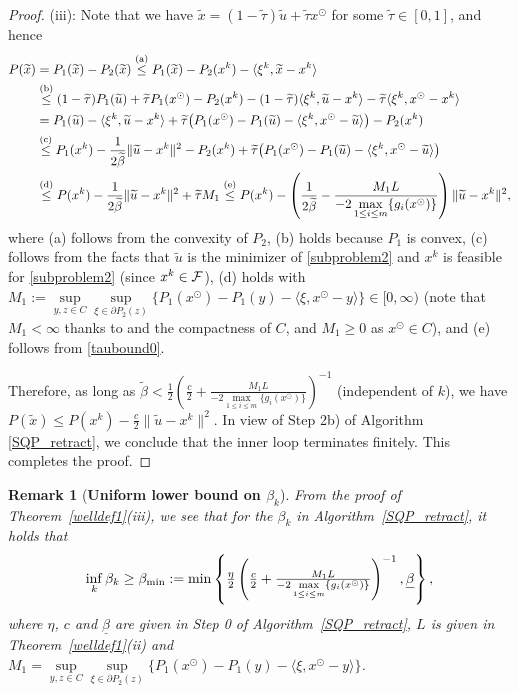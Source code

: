 \documentclass[10pt]{article}
\numberwithin{equation}{section}
\newtheorem{remark}{Remark}[section]
\def\xfeas{x^\odot}
\def\betamin{{\rm \beta_{min}}}
\begin{document}
\begin{proof}
(iii): Note that we have $\widetilde{x} = (1 - \widetilde{\tau})\widetilde{u} + \widetilde{\tau} \xfeas$ for some $\widetilde{\tau}\in [0,1]$, and hence
\[
\begin{aligned}
P(\widetilde{x}) &= P_1(\widetilde{x}) - P_2(\widetilde{x}) \overset{\rm (a)}\leq P_1(\widetilde{x}) - P_2(x^k) - \langle \xi^k, \widetilde{x} - x^k\rangle \\
&\overset{\rm (b)}\leq (1 - \widetilde{\tau})P_1(\widetilde{u}) + \widetilde{\tau}P_1(\xfeas) - P_2(x^k) - (1 - \widetilde{\tau})\langle \xi^k, \widetilde{u} - x^k\rangle - \widetilde{\tau}\langle \xi^k, \xfeas - x^k\rangle\\
&= P_1(\widetilde{u}) - \langle \xi^k, \widetilde{u} - x^k\rangle + \widetilde{\tau}\big(P_1(\xfeas) - P_1(\widetilde{u}) - \langle \xi^k, \xfeas - \widetilde{u}\rangle \big) - P_2(x^k)\\
&\overset{\rm (c)}\leq P_1(x^k) - \frac{1}{2\widetilde{\beta}}\|\widetilde{u} - x^k\|^2  - P_2(x^k) + \widetilde{\tau}\big(P_1(\xfeas) - P_1(\widetilde{u}) - \langle \xi^k, \xfeas - \widetilde{u}\rangle \big)\\
&\overset{\rm (d)}\leq P(x^k) - \frac{1}{2\widetilde{\beta}}\|\widetilde{u} - x^k\|^2 + \widetilde{\tau}M_1 \overset{\rm (e)}\leq P(x^k) - \left(\frac{1}{2\widetilde{\beta}} - \frac{M_1L}{-2\max\limits_{1\le i\le m}\{g_i(\xfeas)\}}\right)\|\widetilde{u} - x^k\|^2,
\end{aligned}
\]
where (a) follows from the convexity of $P_2$, (b) holds because $P_1$ is convex, (c) follows from the facts that $\widetilde{u}$ is the minimizer of \eqref{subproblem2} and $x^k$ is feasible for \eqref{subproblem2} (since $x^k \in {\cal F}$), (d) holds with $M_1:= \sup\limits_{y,z\in C}\sup\limits_{\xi\in\partial P_2(z)} \{P_1(\xfeas) - P_1(y) - \langle\xi, \xfeas - y\rangle\}\in [0,\infty)$ (note that $M_1 < \infty$ thanks to \cite[Theorem~2.6]{Tu98} and the compactness of $C$, and $M_1 \ge 0$ as $\xfeas\in C$), and (e) follows from \eqref{taubound0}.

Therefore, as long as $\widetilde{\beta} < \frac{1}{2}\left(\frac{c}2 + \frac{M_1L}{-2\max\limits_{1 \le i \le m}\{g_i(\xfeas)\}}\right)^{-1}$ (independent of $k$), we have $P(\widetilde{x}) \leq P(x^k) - \frac{c}{2}\|\widetilde{u} - x^k\|^2$. In view of {Step 2b)} of Algorithm \ref{SQP_retract}, we conclude that the inner loop terminates finitely. This completes the proof.
\end{proof}

\begin{remark}[{{\bf Uniform lower bound on $\beta_k$}}]\label{gamma}
From the proof of Theorem~\ref{welldef1}(iii), we see that for the $\beta_k$ in Algorithm~\ref{SQP_retract}, it holds that
\[\inf_k \beta_k \ge \betamin:= \textstyle\min\left\{\frac{\eta}{2}\left(\frac{c}2 + \frac{M_1L}{-2\max\limits_{1 \le i \le m}\{g_i(\xfeas)\}}\right)^{-1},\underline{\beta}\right\},\]
where $\eta$, $c$ and $\underline{\beta}$ are given in Step 0 of Algorithm~\ref{SQP_retract}, $L$ is given in Theorem~\ref{welldef1}(ii) and $M_1= \sup\limits_{y,z\in C}\sup\limits_{\xi\in\partial P_2(z)} \{P_1(\xfeas) - P_1(y) - \langle\xi, \xfeas - y\rangle\}$.
\end{remark}
\end{document}
